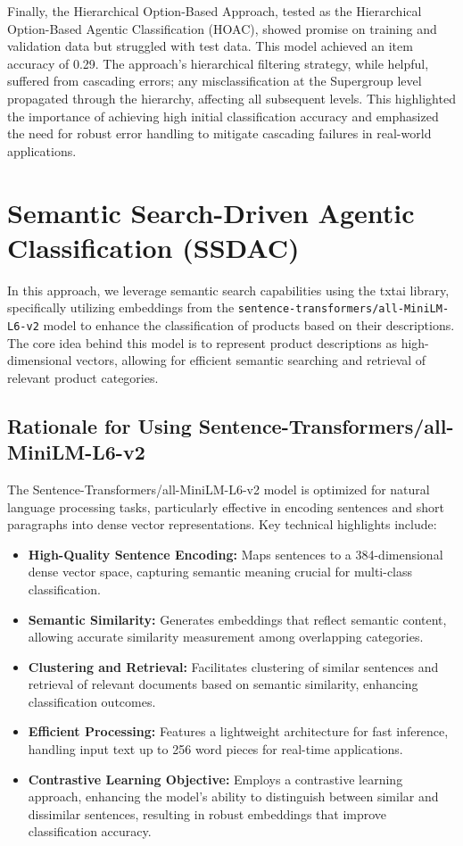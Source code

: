 \documentclass[9pt,a4paper,twoside]{rho-class/rho}
\begin{document}
Finally, the Hierarchical Option-Based Approach, tested as the Hierarchical Option-Based Agentic Classification (HOAC), showed promise on training and validation data but struggled with test data. This model achieved an item accuracy of 0.29. The approach’s hierarchical filtering strategy, while helpful, suffered from cascading errors; any misclassification at the Supergroup level propagated through the hierarchy, affecting all subsequent levels. This highlighted the importance of achieving high initial classification accuracy and emphasized the need for robust error handling to mitigate cascading failures in real-world applications.

\section{Semantic Search-Driven Agentic Classification (SSDAC)}
    In this approach, we leverage semantic search capabilities using the txtai library, specifically utilizing embeddings from the \texttt{sentence-transformers/all-MiniLM-L6-v2} model to enhance the classification of products based on their descriptions. The core idea behind this model is to represent product descriptions as high-dimensional vectors, allowing for efficient semantic searching and retrieval of relevant product categories.

    \subsection{Rationale for Using Sentence-Transformers/all-MiniLM-L6-v2}
    The Sentence-Transformers/all-MiniLM-L6-v2 model is optimized for natural language processing tasks, particularly effective in encoding sentences and short paragraphs into dense vector representations. Key technical highlights include:
    
    \begin{itemize}
        \item \textbf{High-Quality Sentence Encoding:} Maps sentences to a 384-dimensional dense vector space, capturing semantic meaning crucial for multi-class classification.
        \item \textbf{Semantic Similarity:} Generates embeddings that reflect semantic content, allowing accurate similarity measurement among overlapping categories.
        \item \textbf{Clustering and Retrieval:} Facilitates clustering of similar sentences and retrieval of relevant documents based on semantic similarity, enhancing classification outcomes.
        \item \textbf{Efficient Processing:} Features a lightweight architecture for fast inference, handling input text up to 256 word pieces for real-time applications.
        \item \textbf{Contrastive Learning Objective:} Employs a contrastive learning approach, enhancing the model's ability to distinguish between similar and dissimilar sentences, resulting in robust embeddings that improve classification accuracy.
    \end{itemize}
    
\end{document}
